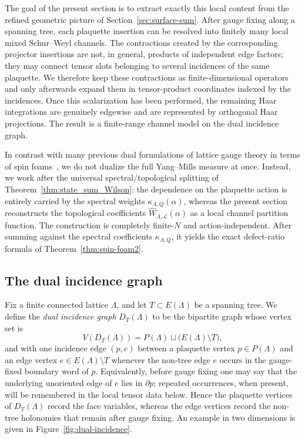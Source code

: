 \documentclass[11pt,a4paper,reqno]{article}
\theoremstyle{definition}
\theoremstyle{remark}
\newcommand\Lc{{\mathcal{L}}}
\begin{document}
The goal of the present section is to extract exactly this local content from the refined geometric picture of Section~\ref{sec:surface-sum}. After gauge fixing along a spanning tree, each plaquette insertion can be resolved into finitely many local mixed Schur--Weyl channels. The contractions created by the corresponding projector insertions are not, in general, products of independent edge factors; they may connect tensor slots belonging to several incidences of the same plaquette. We therefore keep these contractions as finite-dimensional operators and only afterwards expand them in tensor-product coordinates indexed by the incidences. Once this scalarization has been performed, the remaining Haar integrations are genuinely edgewise and are represented by orthogonal Haar projections. The result is a finite-range channel model on the dual incidence graph.

In contrast with many previous dual formulations of lattice gauge theory in terms of spin foams~\cite{OeckPfei01,Oec03,Con05,CCK07}, we do not dualize the full Yang--Mills measure at once. Instead, we work after the universal spectral/topological splitting of Theorem~\ref{thm:state_sum_Wilson}: the dependence on the plaquette action is entirely carried by the spectral weights $\kappa_{\Lambda,Q}(\alpha)$, whereas the present section reconstructs the topological coefficients $\widehat{W}_{\Lambda,\Lc}(\alpha)$ as a local channel partition function. The construction is completely finite-$N$ and action-independent. After summing against the spectral coefficients $\kappa_{\Lambda,Q}$, it yields the exact defect-ratio formula of Theorem~\ref{thm:spin-foam2}.

\subsection{The dual incidence graph}

Fix a finite connected lattice $\Lambda$, and let $T\subset E(\Lambda)$ be a spanning tree. We define the \emph{dual incidence graph} $D_T(\Lambda)$ to be the bipartite graph whose vertex set is
\[
V\left(D_T(\Lambda)\right)=P(\Lambda)\sqcup \bigl(E(\Lambda)\setminus T\bigr),
\]
and with one incidence edge $(p,e)$ between a plaquette vertex $p\in P(\Lambda)$ and an edge vertex $e\in E(\Lambda)\setminus T$ whenever the non-tree edge $e$ occurs in the gauge-fixed boundary word of $p$. Equivalently, before gauge fixing one may say that the underlying unoriented edge of $e$ lies in $\partial p$; repeated occurrences, when present, will be remembered in the local tensor data below. Hence the plaquette vertices of $D_T(\Lambda)$ record the face variables, whereas the edge vertices record the non-tree holonomies that remain after gauge fixing. An example in two dimensions is given in Figure~\ref{fig:dual-incidence}.
\end{document}
